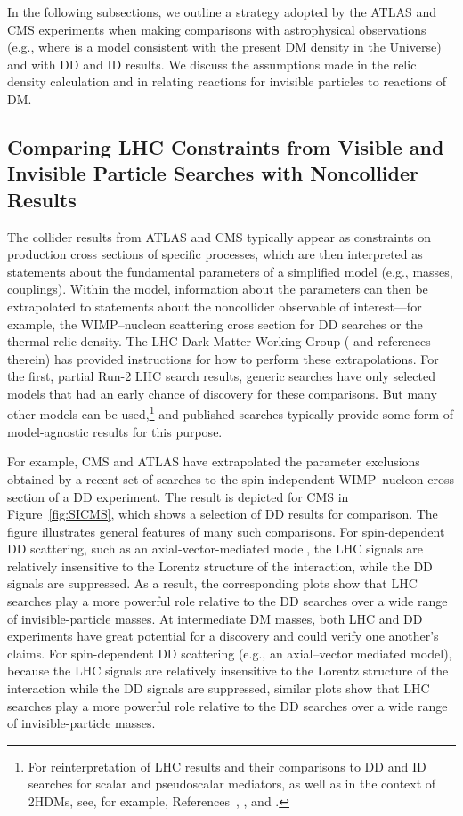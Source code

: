 \documentclass{ar-1col}
\newcommand{\IP}{invisible particle}
\begin{document}
In the following subsections, we outline a strategy adopted by the ATLAS and
CMS experiments when making comparisons with astrophysical
observations (e.g., where is a model consistent with the present
DM density in the Universe) and with DD and ID results. We discuss the
assumptions made in the relic density calculation and in relating
reactions for {\IP}s to reactions of DM.

\subsection{Comparing LHC Constraints from Visible and Invisible Particle Searches with Noncollider Results}

The collider results from ATLAS and CMS typically appear as constraints
on production cross sections of specific processes, which are then
interpreted as statements about the fundamental parameters of a
simplified model (e.g., masses, couplings). Within the model,
information about the parameters can then be extrapolated to
statements about the noncollider observable of interest---for
example, the WIMP--nucleon scattering cross section for DD searches or the
thermal relic density. The LHC Dark
Matter Working Group (\cite{Boveia:2016mrp} and references therein) has provided instructions for how to
perform these extrapolations. For the first, partial Run-2 LHC search results, 
generic searches have only selected models that had an early chance of discovery 
for these comparisons. But many other
models can be used,\footnote{For reinterpretation of LHC results
and their comparisons to DD and ID searches for scalar and pseudoscalar
mediators, as well as in the context of 2HDMs, see, for example, References~, , and .} and
published searches typically provide some form of model-agnostic
results for this purpose.

For example, CMS and ATLAS have extrapolated the parameter exclusions
obtained by a recent set of searches to the spin-independent
WIMP--nucleon cross section of a DD experiment. The
result is depicted for CMS in Figure~\ref{fig:SICMS}, which shows a selection of DD results
for comparison. The figure illustrates general features of
many such comparisons. For spin-dependent DD scattering, such as an axial-vector-mediated model, the LHC signals are relatively insensitive to the Lorentz structure of the interaction, while the DD signals are suppressed. As a result, the corresponding plots show that LHC searches play a more powerful role relative to the DD searches over a wide range of invisible-particle masses. At intermediate DM masses,
both LHC and DD experiments have great potential for a discovery
and could verify one another's claims. For spin-dependent DD
scattering (e.g., an axial--vector mediated model), because the LHC
signals are relatively insensitive to the Lorentz structure of the
interaction while the DD signals are suppressed, similar plots
show that LHC searches play a more powerful role relative to the
DD searches over a wide range of invisible-particle masses.
\end{document}
